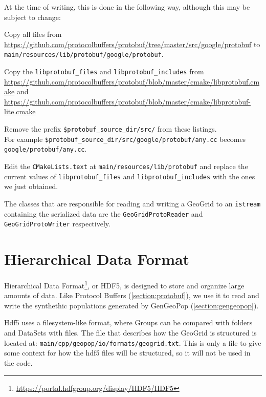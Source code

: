 At the time of writing, this is done in the following way, although this may be subject to change:
\begin{compactitem}
    \item Copy all files from \url{https://github.com/protocolbuffers/protobuf/tree/master/src/google/protobuf} to \texttt{main/resources/lib/protobuf/google/protobuf}.
    \item Copy the \texttt{libprotobuf\_files} and \texttt{libprotobuf\_includes} from \url{https://github.com/protocolbuffers/protobuf/blob/master/cmake/libprotobuf.cmake} and \url{https://github.com/protocolbuffers/protobuf/blob/master/cmake/libprotobuf-lite.cmake}
    \item Remove the prefix \texttt{\${protobuf\_source\_dir}/src/} from these listings.\\
        For example \texttt{\${protobuf\_source\_dir}/src/google/protobuf/any.cc} becomes \texttt{google/protobuf/any.cc}.
    \item Edit the \texttt{CMakeLists.text} at \texttt{main/resources/lib/protobuf} and replace the current values of \texttt{libprotobuf\_files} and \texttt{libprotobuf\_includes} with the ones we just obtained.
\end{compactitem}
The classes that are responsible for reading and writing a GeoGrid to an \texttt{istream} containing the serialized data are the \texttt{GeoGridProtoReader} and \texttt{GeoGridProtoWriter} respectively.

\section{Hierarchical Data Format}
\label{section:hdf5}

Hierarchical Data Format\footnote{\url{https://portal.hdfgroup.org/display/HDF5/HDF5}}, or HDF5, is designed to store and organize large amounts of data. Like Protocol Buffers (\ref{section:protobuf}), we use it to read and write the synthethic populations generated by GenGeoPop (\ref{section:gengeopop}).

Hdf5 uses a filesystem-like format, where Groups can be compared with folders and DataSets with files. The file that describes how the GeoGrid is structured is located at: \texttt{main/cpp/geopop/io/formats/geogrid.txt}. This is only a file to give some context for how the hdf5 files will be structured, so it will not be used in the code. 

